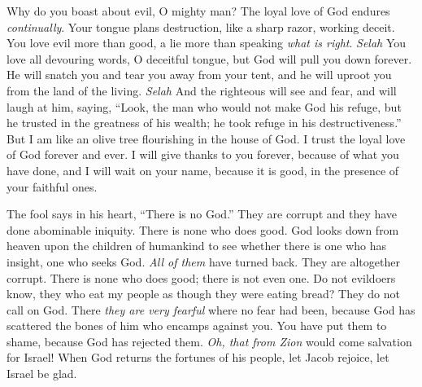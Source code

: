 \begin{biblechapter} %
 Why do you boast about evil, O mighty man? 
The loyal love of God endures \textit{continually}.
\verse Your tongue plans destruction, 
like a sharp razor, working deceit.
\verse You love evil more than good, 
a lie more than speaking \textit{what is right}. \textit{Selah}
\verse You love all devouring words, 
O deceitful tongue,
\verse but God will pull you down forever. 
He will snatch you and tear you away from your tent, 
and he will uproot you from the land of the living. \textit{Selah}
\verse And the righteous will see and fear, 
and will laugh at him, saying,
\verse “Look, the man who would not make God his refuge, 
but he trusted in the greatness of his wealth; 
he took refuge in his destructiveness.”
\verse But I am like an olive tree flourishing 
in the house of God. 
I trust the loyal love of God forever and ever.
\verse I will give thanks to you forever, because of what you have done, 
and I will wait on your name, because it is good, 
in the presence of your faithful ones.
\end{biblechapter}

\begin{biblechapter} %
 The fool says in his heart, “There is no God.” 
They are corrupt and they have done abominable iniquity. 
There is none who does good.
\verse God looks down from heaven upon the children of humankind 
to see whether there is one who has insight, 
one who seeks God.
\verse \textit{All of them} have turned back. 
They are altogether corrupt. 
There is none who does good; 
there is not even one.
\verse Do not evildoers know, 
they who eat my people as though they were eating bread? 
They do not call on God.
\verse There \textit{they are very fearful} 
where no fear had been, 
because God has scattered the bones of him who encamps against you. 
You have put them to shame, because God has rejected them.
\verse \textit{Oh, that from Zion} would come salvation for Israel! 
When God returns the fortunes of his people, 
let Jacob rejoice, let Israel be glad.
\end{biblechapter}

